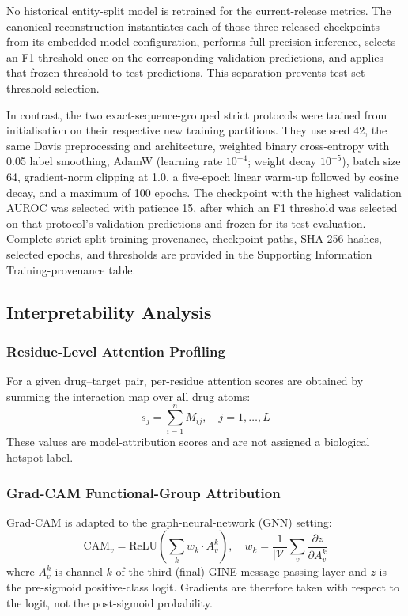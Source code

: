 \documentclass[fleqn,10pt]{wlscirep}
\begin{document}
No historical entity-split model is retrained for the current-release metrics.
The canonical reconstruction instantiates each of those three released
checkpoints from its embedded model configuration, performs full-precision
inference, selects an F1 threshold once on the corresponding validation
predictions, and applies that frozen threshold to test predictions. This
separation prevents test-set threshold selection.

In contrast, the two exact-sequence-grouped strict protocols were trained from
initialisation on their respective new training partitions. They use seed 42,
the same Davis preprocessing and architecture, weighted binary cross-entropy
with 0.05 label smoothing, AdamW (learning rate $10^{-4}$; weight decay
$10^{-5}$), batch size 64, gradient-norm clipping at 1.0, a five-epoch linear
warm-up followed by cosine decay, and a maximum of 100 epochs. The checkpoint
with the highest validation AUROC was selected with patience 15, after which an
F1 threshold was selected on that protocol's validation predictions and frozen
for its test evaluation. Complete strict-split training provenance, checkpoint
paths, SHA-256 hashes, selected epochs, and thresholds are provided in the
Supporting Information Training-provenance table.
\endgroup

\subsection{Interpretability Analysis}

\subsubsection{Residue-Level Attention Profiling}

For a given drug--target pair, per-residue attention scores are obtained by
summing the interaction map over all drug atoms:
\begin{equation}
s_j = \sum_{i=1}^{n} M_{ij},\quad j=1,\ldots,L
\end{equation}
\begingroup\color{red}These values are model-attribution scores and are not
assigned a biological hotspot label.\endgroup

\begingroup\color{red}\subsubsection{Grad-CAM Functional-Group Attribution}\endgroup

Grad-CAM\cite{selvaraju2017grad} is adapted to the \begingroup\color{red}graph-neural-network (GNN)\endgroup
setting:
\begin{equation}
\mathrm{CAM}_v = \mathrm{ReLU}\!\left(\sum_k w_k\cdot A_v^k\right),\quad
w_k = \frac{1}{|\mathcal{V}|}\sum_v\frac{\partial z}{\partial A_v^k}
\end{equation}
\begingroup\color{red}
where $A_v^k$ is channel $k$ of the third (final) GINE message-passing layer
and $z$ is the pre-sigmoid positive-class logit. Gradients are therefore taken
with respect to the logit, not the post-sigmoid probability.
\end{document}
